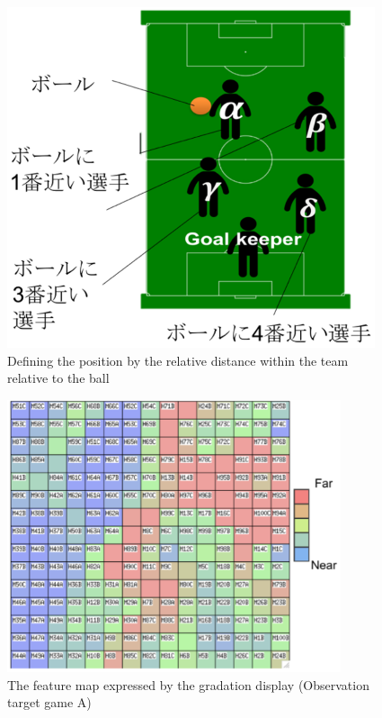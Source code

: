 \begin{figure}[htb]
  \begin{center}
    \includegraphics[clip,height=10cm]{figure/Defining_the_position_by_the_relative_distance_within_the_team_relative_to_the_ball.eps}
    \caption{Defining the position by the relative distance within the team relative to the ball}
    \label{fig:Defining}
 \end{center}
\end{figure}

\begin{figure}[htb]
  \begin{center}
      \includegraphics[clip,height=8.0cm]{figure/The_feature_map_expressed_by_the_gradation_display_Observation_target_game_A.eps}
    \caption{The feature map expressed by the gradation display (Observation target game A)}
    \label{fig:SOM_result01}
\end{center}
\end{figure}

